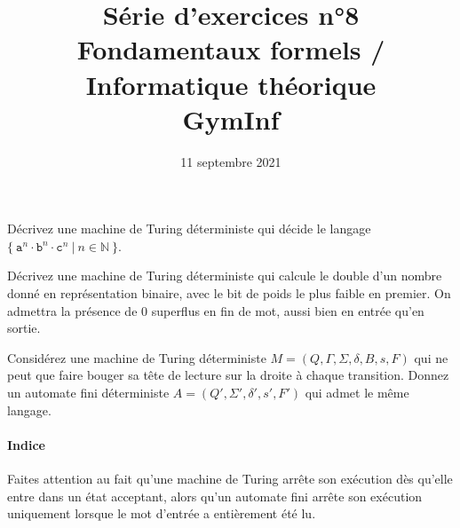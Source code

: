\documentclass[12pt,french,a4paper]{article}
\begin{document}
\title{\vspace{-2cm}Série d'exercices n°8\\\large{Fondamentaux formels / Informatique théorique\\GymInf}}
\date{\vspace{-1cm}11 septembre 2021}

\maketitle

\begin{question}
Décrivez une machine de Turing déterministe qui décide le langage $\{\ \texttt{a}^n \cdot \texttt{b}^n \cdot \texttt{c}^n\ |\ n \in \mathbb{N}\ \}$.
\end{question}

\vspace{1cm}

\begin{question}
Décrivez une machine de Turing déterministe qui calcule le double d'un nombre donné en représentation binaire, avec le bit de poids le plus faible en premier. On admettra la présence de $0$ superflus en fin de mot, aussi bien en entrée qu'en sortie.
\end{question}

\vspace{1cm}

\begin{question}
Considérez une machine de Turing déterministe $M = (Q, \Gamma, \Sigma, \delta, B, s, F)$ qui ne peut que faire bouger sa tête de lecture sur la droite à chaque transition. Donnez un automate fini déterministe $A = (Q', \Sigma', \delta', s', F')$ qui admet le même langage.

\paragraph{Indice} Faites attention au fait qu'une machine de Turing arrête son exécution dès qu'elle entre dans un état acceptant, alors qu'un automate fini arrête son exécution uniquement lorsque le mot d'entrée a entièrement été lu.
\end{question}

\vspace{1cm}
\end{document}
